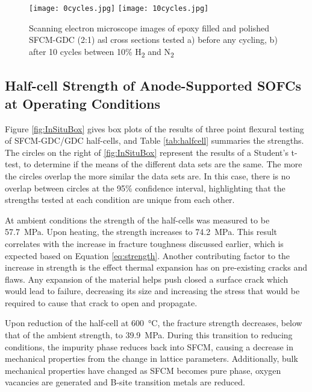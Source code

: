         \begin{figure}
          \texttt{[image: 0cycles.jpg]}
          \texttt{[image: 10cycles.jpg]}
          \caption{Scanning electron microscope images of epoxy filled and polished SFCM-GDC (2:1) \gls{asl}  cross sections tested a) before any cycling, b) after 10 cycles between 10\% H\textsubscript{2} and N\textsubscript{2}}
          \label{fig:cycledSEM}
        \end{figure}

    \subsection{Half-cell Strength of Anode-Supported SOFCs at Operating Conditions}
        Figure \ref{fig:InSituBox} gives box plots of the results of three point flexural testing of SFCM-GDC/GDC half-cells, and Table \ref{tab:halfcell} summaries the strengths.
        The circles on the right of \ref{fig:InSituBox} represent the results of a Student's t-test, to determine if the means of the different data sets are the same.
        The more the circles overlap the more similar the data sets are.
        In this case, there is no overlap between circles at the 95\% confidence interval, highlighting that the strengths tested at each condition are unique from each other.

        At ambient conditions the strength of the half-cells was measured to be \SI{57.7}{\mega\pascal}.
        Upon heating, the strength increases to \SI{74.2}{\mega\pascal}.
        This result correlates with the increase in fracture toughness discussed earlier, which is expected based on Equation \ref{eq:strength}.
        Another contributing factor to the increase in strength is the effect thermal expansion has on pre-existing cracks and flaws.
        Any expansion of the material helps push closed a surface crack which would lead to failure, decreasing its size and increasing the stress that would be required to cause that crack to open and propagate.

        Upon reduction of the half-cell at \SI{600}{\celsius}, the fracture strength decreases, below that of the ambient strength, to \SI{39.9}{\mega\pascal}.
        During this transition to reducing conditions, the impurity phase reduces back into SFCM, causing a decrease in mechanical properties from the change in lattice parameters.
        Additionally, bulk mechanical properties have changed as SFCM becomes pure phase, oxygen vacancies are generated and B-site transition metals are reduced.

